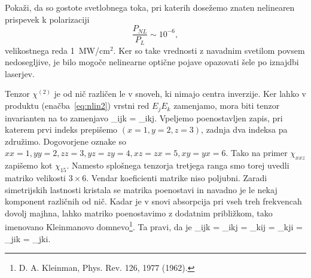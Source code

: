 \begin{definition}
Pokaži, da so gostote svetlobnega toka, pri katerih dosežemo znaten nelinearen 
prispevek k polarizaciji 
 $$\frac{P_{NL}}{P_L} \sim 10^{-6},$$
velikostnega reda 1~MW/cm$^2$. 
Ker so take vrednosti z navadnim svetilom povsem nedosegljive, je bilo mogoče nelinearne
optične pojave opazovati šele po iznajdbi laserjev.
\end{definition}
 
Tenzor $\chi^{(2)}$ je od nič različen le v snoveh, ki nimajo centra inverzije. 
Ker lahko v produktu (enačba~\ref{eq:nlin2}) vrstni red $E_j E_k$ zamenjamo, mora biti
tenzor invarianten na to zamenjavo
\beq
\chi_{ijk} = \chi_{ikj}.
\eeq
Vpeljemo poenostavljen zapis, pri katerem prvi indeks prepišemo $(x = 1, y = 2, z = 3)$,
zadnja dva indeksa pa združimo. Dogovorjene oznake so $xx = 1, yy = 2, zz = 3, yz = zy =4, 
xz = zx =5, xy = yx = 6$. Tako na primer $\chi_{xxz}$ zapišemo kot $\chi_{15}$. Namesto
splošnega tenzorja tretjega ranga smo torej uvedli matriko velikosti $3\times6$. 
Vendar koeficienti matrike niso poljubni. Zaradi simetrijskih lastnosti kristala se matrika
poenostavi in navadno je le nekaj komponent različnih od nič. 
Kadar je v snovi absorpcija pri vseh treh frekvencah dovolj majhna, lahko matriko poenostavimo
z dodatnim približkom, tako imenovano  
 Kleinmanovo domnevo\footnote{D. A. Kleinman, Phys. Rev. 126, 1977 (1962).}.
Ta pravi, da je 
\beq
\chi_{ijk} = \chi_{ikj} = \chi_{kij} = \chi_{kji} = \chi_{jik} = \chi_{jki}.
\eeq
